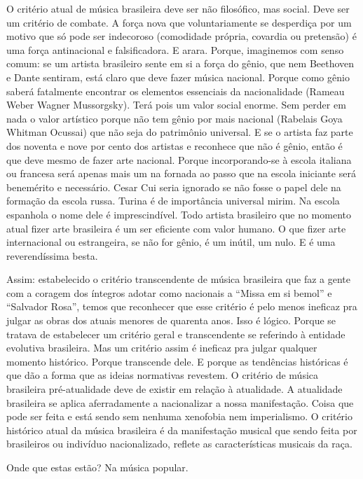 O critério atual de música brasileira deve ser não filosófico, mas
social. Deve ser um critério de combate. A força nova que
voluntariamente se desperdiça por um motivo que só pode ser indecoroso
(comodidade própria, covardia ou pretensão) é uma força antinacional e
falsificadora. E arara. Porque, imaginemos com senso comum: se um
artista brasileiro sente em si a força do gênio, que nem Beethoven e
Dante sentiram, está claro que deve fazer música nacional. Porque como
gênio saberá fatalmente encontrar os elementos essenciais da
nacionalidade (Rameau Weber Wagner Mussorgsky). Terá pois um valor
social enorme. Sem perder em nada o valor artístico porque não tem gênio
por mais nacional (Rabelais Goya Whitman Ocussai) que não seja do
patrimônio universal. E se o artista faz parte dos noventa e nove por cento dos
artistas e reconhece que não é gênio, então é que deve mesmo de fazer
arte nacional. Porque incorporando-se à escola italiana ou francesa será
apenas mais um na fornada ao passo que na escola iniciante será
benemérito e necessário. Cesar Cui seria ignorado se não fosse o papel
dele na formação da escola russa. Turina é de importância universal
mirim. Na escola espanhola o nome dele é imprescindível. Todo artista
brasileiro que no momento atual fizer arte brasileira é um ser eficiente
com valor humano. O que fizer arte internacional ou estrangeira, se não
for gênio, é um inútil, um nulo. E é uma reverendíssima besta.

Assim: estabelecido o critério transcendente de música brasileira que
faz a gente com a coragem dos íntegros adotar como nacionais a ``Missa em
si bemol'' e ``Salvador Rosa'', temos que reconhecer que esse critério é pelo
menos ineficaz pra julgar as obras dos atuais menores de quarenta anos.
Isso é lógico. Porque se tratava de estabelecer um critério geral e
transcendente se referindo à entidade evolutiva brasileira. Mas um
critério assim é ineficaz pra julgar qualquer momento histórico. Porque
transcende dele. E porque as tendências históricas é que dão a forma que
as ideias normativas revestem. O critério de música brasileira
pré-atualidade deve de existir em relação à atualidade. A atualidade
brasileira se aplica aferradamente a nacionalizar a nossa manifestação.
Coisa que pode ser feita e está sendo sem nenhuma xenofobia nem
imperialismo. O critério histórico atual da música brasileira é da
manifestação musical que sendo feita por brasileiros ou indivíduo
nacionalizado, reflete as características musicais da raça.

Onde que estas estão? Na música popular.

